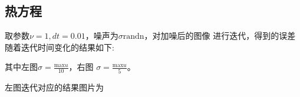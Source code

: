 \documentclass[a4paper,  11pt]{ctexart}
\begin{document}
\subsection{热方程}
取参数$\nu=1,dt=0.01$，噪声为$\sigma \text{randn}$，对加噪后的图像
进行迭代，得到的误差随着迭代时间变化的结果如下:
\begin{figure}[H]
    \centering
\end{figure}
其中左图$\sigma=\frac{\text{max}u}{10}$，右图
$\sigma=\frac{\text{max}u}{5}$。\par
左图迭代对应的结果图片为
\end{document}

